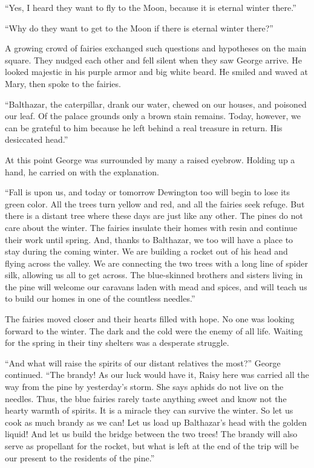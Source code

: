 \documentclass[10pt]{memoir}
\begin{document}
``Yes, I heard they want to fly to the Moon, because it is eternal winter
there.''

``Why do they want to get to the Moon if there is eternal winter there?''

A growing crowd of fairies exchanged such questions and hypotheses on the main
square. They nudged each other and fell silent when they saw George arrive. He
looked majestic in his purple armor and big white beard. He smiled and waved at
Mary, then spoke to the fairies.

``Balthazar, the caterpillar, drank our water, chewed on our houses, and
poisoned our leaf. Of the palace grounds only a brown stain remains. Today,
however, we can be grateful to him because he left behind a real treasure in
return. His desiccated head.''

At this point George was surrounded by many a raised eyebrow. Holding up a
hand, he carried on with the explanation.

``Fall is upon us, and today or tomorrow Dewington too will begin to lose its
green color. All the trees turn yellow and red, and all the fairies seek
refuge. But there is a distant tree where these days are just like any other.
The pines do not care about the winter. The fairies insulate their homes with
resin and continue their work until spring. And, thanks to Balthazar, we too
will have a place to stay during the coming winter. We are building a rocket
out of his head and flying across the valley. We are connecting the two trees
with a long line of spider silk, allowing us all to get across. The
blue-skinned brothers and sisters living in the pine will welcome our caravans
laden with mead and spices, and will teach us to build our homes in one of the
countless needles.''

The fairies moved closer and their hearts filled with hope. No one was looking
forward to the winter. The dark and the cold were the enemy of all life.
Waiting for the spring in their tiny shelters was a desperate struggle.

``And what will raise the spirits of our distant relatives the most?'' George
continued. ``The brandy! As our luck would have it, Raisy here was carried all
the way from the pine by yesterday's storm. She says aphids do not live on the
needles. Thus, the blue fairies rarely taste anything sweet and know not the
hearty warmth of spirits. It is a miracle they can survive the winter. So let
us cook as much brandy as we can! Let us load up Balthazar's head with the
golden liquid! And let us build the bridge between the two trees! The brandy
will also serve as propellant for the rocket, but what is left at the end of
the trip will be our present to the residents of the pine.''
\end{document}
